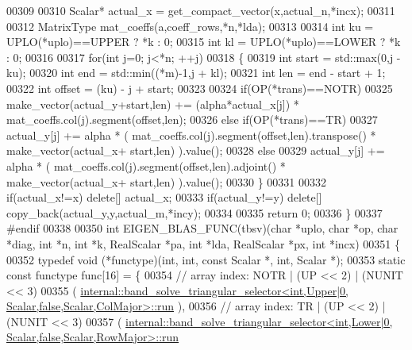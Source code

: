 \begin{DoxyCode}
00309 
00310   Scalar* actual\_x = get\_compact\_vector(x,actual\_n,*incx);
00311 
00312   MatrixType mat\_coeffs(a,coeff\_rows,*n,*lda);
00313 
00314   \textcolor{keywordtype}{int} ku = UPLO(*uplo)==UPPER ? *k : 0;
00315   \textcolor{keywordtype}{int} kl = UPLO(*uplo)==LOWER ? *k : 0;
00316 
00317   \textcolor{keywordflow}{for}(\textcolor{keywordtype}{int} j=0; j<*n; ++j)
00318   \{
00319     \textcolor{keywordtype}{int} start = std::max(0,j - ku);
00320     \textcolor{keywordtype}{int} end = std::min((*m)-1,j + kl);
00321     \textcolor{keywordtype}{int} len = end - start + 1;
00322     \textcolor{keywordtype}{int} offset = (ku) - j + start;
00323 
00324     \textcolor{keywordflow}{if}(OP(*trans)==NOTR)
00325       make\_vector(actual\_y+start,len) += (alpha*actual\_x[j]) * mat\_coeffs.col(j).segment(offset,len);
00326     \textcolor{keywordflow}{else} \textcolor{keywordflow}{if}(OP(*trans)==TR)
00327       actual\_y[j] += alpha * ( mat\_coeffs.col(j).segment(offset,len).transpose() * make\_vector(actual\_x+
      start,len) ).value();
00328     \textcolor{keywordflow}{else}
00329       actual\_y[j] += alpha * ( mat\_coeffs.col(j).segment(offset,len).adjoint()   * make\_vector(actual\_x+
      start,len) ).value();
00330   \}
00331 
00332   \textcolor{keywordflow}{if}(actual\_x!=x) \textcolor{keyword}{delete}[] actual\_x;
00333   \textcolor{keywordflow}{if}(actual\_y!=y) \textcolor{keyword}{delete}[] copy\_back(actual\_y,y,actual\_m,*incy);
00334 
00335   \textcolor{keywordflow}{return} 0;
00336 \}
00337 \textcolor{preprocessor}{#endif}
00338 
00350 \textcolor{keywordtype}{int} EIGEN\_BLAS\_FUNC(tbsv)(\textcolor{keywordtype}{char} *uplo, \textcolor{keywordtype}{char} *op, \textcolor{keywordtype}{char} *diag, \textcolor{keywordtype}{int} *n, \textcolor{keywordtype}{int} *k, RealScalar *pa, \textcolor{keywordtype}{int} *lda, 
      RealScalar *px, \textcolor{keywordtype}{int} *incx)
00351 \{
00352   \textcolor{keyword}{typedef} void (*functype)(int, int, \textcolor{keyword}{const} Scalar *, int, Scalar *);
00353   \textcolor{keyword}{static} \textcolor{keyword}{const} functype func[16] = \{
00354     \textcolor{comment}{// array index: NOTR  | (UP << 2) | (NUNIT << 3)}
00355     (
      \hyperlink{structinternal_1_1band__solve__triangular__selector}{internal::band\_solve\_triangular\_selector<int,Upper|0,       Scalar,false,Scalar,ColMajor>::run}
      ),
00356     \textcolor{comment}{// array index: TR    | (UP << 2) | (NUNIT << 3)}
00357     (
      \hyperlink{structinternal_1_1band__solve__triangular__selector}{internal::band\_solve\_triangular\_selector<int,Lower|0,       Scalar,false,Scalar,RowMajor>::run}

\end{DoxyCode}
